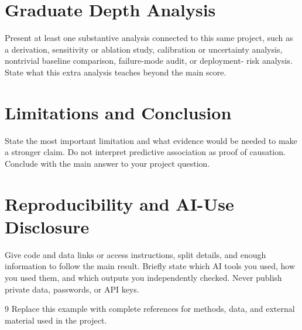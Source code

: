 \documentclass{article}
\begin{document}
\section{Graduate Depth Analysis}
Present at least one substantive analysis connected to this same project, such
as a derivation, sensitivity or ablation study, calibration or uncertainty
analysis, nontrivial baseline comparison, failure-mode audit, or deployment-
risk analysis. State what this extra analysis teaches beyond the main score.

\section{Limitations and Conclusion}
State the most important limitation and what evidence would be needed to make a
stronger claim. Do not interpret predictive association as proof of causation.
Conclude with the main answer to your project question.

\section{Reproducibility and AI-Use Disclosure}
Give code and data links or access instructions, split details, and enough
information to follow the main result. Briefly state which AI tools you used,
how you used them, and which outputs you independently checked. Never publish
private data, passwords, or API keys.

\begin{thebibliography}{9}
Replace this example with complete references for methods, data, and external
material used in the project.
\end{thebibliography}
\end{document}
